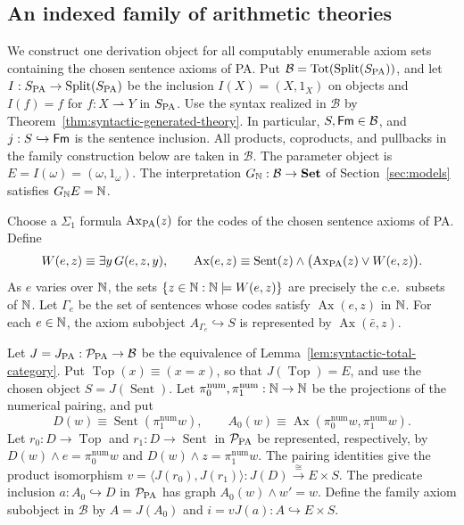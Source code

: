 \subsection{An indexed family of arithmetic theories}
\label{subsec:indexed-arithmetic-theories}

We construct one derivation object for all computably enumerable
axiom sets containing the chosen sentence axioms of PA. Put
$\mathcal B=\operatorname{Tot}(\operatorname{Split}(S_{\mathrm{PA}}))$, and let
$I:S_{\mathrm{PA}}\to\operatorname{Split}(S_{\mathrm{PA}})$ be the inclusion
$I(X)=(X,1_X)$ on objects and $I(f)=f$ for
$f:X\rightharpoonup Y$ in $S_{\mathrm{PA}}$.
Use the syntax realized in $\mathcal B$ by
Theorem~\ref{thm:syntactic-generated-theory}. In particular,
$S,\mathsf{Fm}\in\mathcal B$, and $j:S\hookrightarrow\mathsf{Fm}$ is the
sentence inclusion. All products, coproducts, and pullbacks in
the family construction below are taken in $\mathcal B$.
The parameter object is $E=I(\omega)=(\omega,1_\omega)$.
The interpretation $G_{\mathbb N}:\mathcal B\to\mathbf{Set}$ of
Section~\ref{sec:models} satisfies $G_{\mathbb N}E=\mathbb N$.

Choose a $\Sigma_1$ formula $\operatorname{Ax}_{\mathrm{PA}}(z)$
for the codes of the chosen sentence axioms of PA. Define
\[
 W(e,z)\equiv\exists y\,G(e,z,y),\qquad
 \operatorname{Ax}(e,z)\equiv
 \operatorname{Sent}(z)\land
       \bigl(\operatorname{Ax}_{\mathrm{PA}}(z)\lor W(e,z)\bigr).
\]
As $e$ varies over $\mathbb N$, the sets
$\{z\in\mathbb N:\mathbb N\models W(e,z)\}$ are precisely the c.e.\ subsets of
$\mathbb N$. Let $\Gamma_e$ be the set of sentences whose codes
satisfy $\operatorname{Ax}(e,z)$ in $\mathbb N$.
For each $e\in\mathbb N$, the axiom subobject
$A_{\Gamma_e}\hookrightarrow S$ is represented by
$\operatorname{Ax}(\bar e,z)$.

Let $J=J_{\mathrm{PA}}:\mathcal P_{\mathrm{PA}}\to\mathcal B$ be the
equivalence of Lemma~\ref{lem:syntactic-total-category}.
Put $\operatorname{Top}(x)\equiv(x=x)$, so that
$J(\operatorname{Top})=E$, and use the chosen object
$S=J(\operatorname{Sent})$.
Let $\pi_0^{\mathrm{num}},\pi_1^{\mathrm{num}}:\mathbb N\to\mathbb N$
be the projections of the numerical pairing, and put
\[
 D(w)\equiv\operatorname{Sent}(\pi_1^{\mathrm{num}}w),\qquad
 A_0(w)\equiv\operatorname{Ax}
            (\pi_0^{\mathrm{num}}w,\pi_1^{\mathrm{num}}w).
\]
Let $r_0:D\to\operatorname{Top}$ and
$r_1:D\to\operatorname{Sent}$ in $\mathcal P_{\mathrm{PA}}$ be
represented, respectively, by
$D(w)\land e=\pi_0^{\mathrm{num}}w$ and
$D(w)\land z=\pi_1^{\mathrm{num}}w$.
The pairing identities give the product isomorphism
$v=\langle J(r_0),J(r_1)\rangle:J(D)\xrightarrow{\cong}E\times S$.
The predicate inclusion $a:A_0\hookrightarrow D$ in
$\mathcal P_{\mathrm{PA}}$ has graph $A_0(w)\land w'=w$.
Define the family axiom subobject in $\mathcal B$ by
$A=J(A_0)$ and $i=vJ(a):A\hookrightarrow E\times S$.

